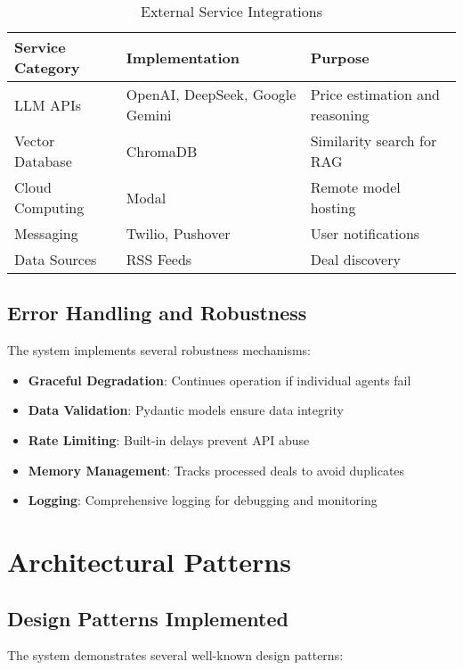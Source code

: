 \begin{table}[htbp]
\centering
\begin{tabular}{@{}lll@{}}
\toprule
Service Category & Implementation & Purpose \\
\midrule
LLM APIs & OpenAI, DeepSeek, Google Gemini & Price estimation and reasoning \\
Vector Database & ChromaDB & Similarity search for RAG \\
Cloud Computing & Modal & Remote model hosting \\
Messaging & Twilio, Pushover & User notifications \\
Data Sources & RSS Feeds & Deal discovery \\
\bottomrule
\end{tabular}
\caption{External Service Integrations}
\label{tab:external_services}
\end{table}

\subsection{Error Handling and Robustness}

The system implements several robustness mechanisms:

\begin{itemize}
\item \textbf{Graceful Degradation}: Continues operation if individual agents fail
\item \textbf{Data Validation}: Pydantic models ensure data integrity
\item \textbf{Rate Limiting}: Built-in delays prevent API abuse
\item \textbf{Memory Management}: Tracks processed deals to avoid duplicates
\item \textbf{Logging}: Comprehensive logging for debugging and monitoring
\end{itemize}

\section{Architectural Patterns}

\subsection{Design Patterns Implemented}

The system demonstrates several well-known design patterns:

